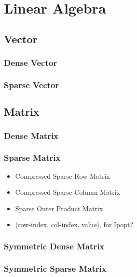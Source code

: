 \documentclass[10pt]{report}
\begin{document}
\chapter{Linear Algebra}

\section{Vector}

\subsection{Dense Vector}

\subsection{Sparse Vector}

\section{Matrix}

\subsection{Dense Matrix}

\subsection{Sparse Matrix}
\begin{itemize}
\item Compressed Sparse Row Matrix
\item Compressed Sparse Column Matrix
\item Sparse Outer Product Matrix
\item (row-index, col-index, value), for Ipopt?
\end{itemize}

\subsection{Symmetric Dense Matrix}
\subsection{Symmetric Sparse Matrix}

\end{document}
